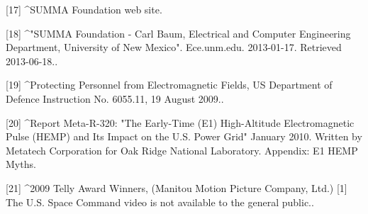[17]
^SUMMA Foundation web site.

[18]
^"SUMMA Foundation - Carl Baum, Electrical and Computer Engineering Department, University of New Mexico". Ece.unm.edu. 2013-01-17. Retrieved 2013-06-18..

[19]
^Protecting Personnel from Electromagnetic Fields, US Department of Defence Instruction No. 6055.11, 19 August 2009..

[20]
^Report Meta-R-320: "The Early-Time (E1) High-Altitude Electromagnetic Pulse (HEMP) and Its Impact on the U.S. Power Grid" January 2010. Written by Metatech Corporation for Oak Ridge National Laboratory. Appendix: E1 HEMP Myths.

[21]
^2009 Telly Award Winners, (Manitou Motion Picture Company, Ltd.) [1] The U.S. Space Command video is not available to the general public..